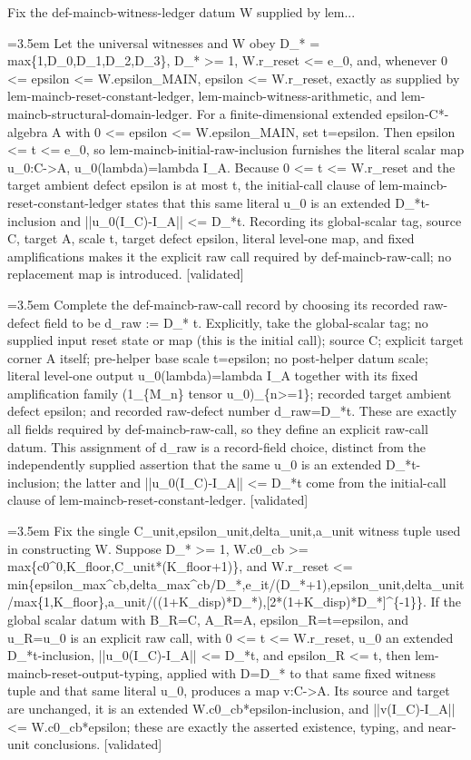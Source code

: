 \documentclass{article}
\newcommand{\step}[1]{\par\noindent\hangindent=3.5em\hangafter=1%
  \makebox[3.5em][l]{\textbf{#1.}}}
\newcommand{\steptag}[1]{\hfill{\small\textsf{[#1]}}}
\begin{document}
\begin{proofbox}{Fix the def-maincb-witness-ledger datum W supplied by lem...}
\step{1.1.2} Let the universal witnesses and W obey D\_* = max\{1,D\_0,D\_1,D\_2,D\_3\}, D\_* >= 1, W.r\_reset <= e\_0, and, whenever 0 <= epsilon <= W.epsilon\_MAIN, epsilon <= W.r\_reset, exactly as supplied by lem-maincb-reset-constant-ledger, lem-maincb-witness-arithmetic, and lem-maincb-structural-domain-ledger. For a finite-dimensional extended epsilon-C*-algebra A with 0 <= epsilon <= W.epsilon\_MAIN, set t=epsilon. Then epsilon <= t <= e\_0, so lem-maincb-initial-raw-inclusion furnishes the literal scalar map u\_0:C->A, u\_0(lambda)=lambda I\_A. Because 0 <= t <= W.r\_reset and the target ambient defect epsilon is at most t, the initial-call clause of lem-maincb-reset-constant-ledger states that this same literal u\_0 is an extended D\_*t-inclusion and ||u\_0(I\_C)-I\_A|| <= D\_*t. Recording its global-scalar tag, source C, target A, scale t, target defect epsilon, literal level-one map, and fixed amplifications makes it the explicit raw call required by def-maincb-raw-call; no replacement map is introduced. \steptag{validated} \\[6pt]
\step{1.1.2.1} Complete the def-maincb-raw-call record by choosing its recorded raw-defect field to be d\_raw := D\_* t. Explicitly, take the global-scalar tag; no supplied input reset state or map (this is the initial call); source C; explicit target corner A itself; pre-helper base scale t=epsilon; no post-helper datum scale; literal level-one output u\_0(lambda)=lambda I\_A together with its fixed amplification family (1\_\{M\_n\} tensor u\_0)\_\{n>=1\}; recorded target ambient defect epsilon; and recorded raw-defect number d\_raw=D\_*t. These are exactly all fields required by def-maincb-raw-call, so they define an explicit raw-call datum. This assignment of d\_raw is a record-field choice, distinct from the independently supplied assertion that the same u\_0 is an extended D\_*t-inclusion; the latter and ||u\_0(I\_C)-I\_A|| <= D\_*t come from the initial-call clause of lem-maincb-reset-constant-ledger. \steptag{validated} \\[4pt]
\step{1.1.3} Fix the single C\_unit,epsilon\_unit,delta\_unit,a\_unit witness tuple used in constructing W. Suppose D\_* >= 1, W.c0\_cb >= max\{c0\textasciicircum{}0,K\_floor,C\_unit*(K\_floor+1)\}, and W.r\_reset <= min\{epsilon\_max\textasciicircum{}cb,delta\_max\textasciicircum{}cb/D\_*,e\_it/(D\_*+1),epsilon\_unit,delta\_unit/max\{1,K\_floor\},a\_unit/((1+K\_disp)*D\_*),[2*(1+K\_disp)*D\_*]\textasciicircum{}\{-1\}\}. If the global scalar datum with B\_R=C, A\_R=A, epsilon\_R=t=epsilon, and u\_R=u\_0 is an explicit raw call, with 0 <= t <= W.r\_reset, u\_0 an extended D\_*t-inclusion, ||u\_0(I\_C)-I\_A|| <= D\_*t, and epsilon\_R <= t, then lem-maincb-reset-output-typing, applied with D=D\_* to that same fixed witness tuple and that same literal u\_0, produces a map v:C->A. Its source and target are unchanged, it is an extended W.c0\_cb*epsilon-inclusion, and ||v(I\_C)-I\_A|| <= W.c0\_cb*epsilon; these are exactly the asserted existence, typing, and near-unit conclusions. \steptag{validated} \\[4pt]
\end{proofbox}
\end{document}
